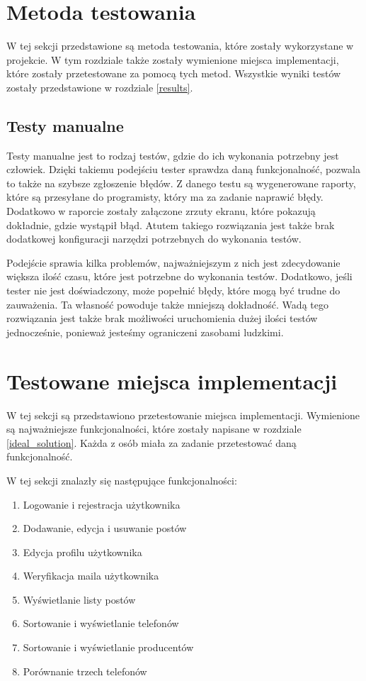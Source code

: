 \section{Metoda testowania}
W tej sekcji przedstawione są metoda testowania, które zostały wykorzystane w projekcie. W tym rozdziale także zostały wymienione miejsca implementacji, które zostały przetestowane za pomocą tych metod. Wszystkie wyniki testów zostały przedstawione w rozdziale \ref{results}. 

\subsection{Testy manualne}
Testy manualne jest to rodzaj testów, gdzie do ich wykonania potrzebny jest człowiek. Dzięki takiemu podejściu tester sprawdza daną funkcjonalność, pozwala to także na szybsze zgłoszenie błędów. Z danego testu są wygenerowane raporty, które są przesyłane do programisty, który ma za zadanie naprawić błędy. Dodatkowo w raporcie zostały załączone zrzuty ekranu, które pokazują dokładnie, gdzie wystąpił błąd. Atutem takiego rozwiązania jest także brak dodatkowej konfiguracji narzędzi potrzebnych do wykonania testów.

Podejście sprawia kilka problemów, najważniejszym z nich jest zdecydowanie większa ilość czasu, które jest potrzebne do wykonania testów. Dodatkowo, jeśli tester nie jest doświadczony, może popełnić błędy, które mogą być trudne do zauważenia. Ta własność powoduje także mniejszą dokładność. Wadą tego rozwiązania jest także brak możliwości uruchomienia dużej ilości testów jednocześnie, ponieważ jesteśmy ograniczeni zasobami ludzkimi. 

\section{Testowane miejsca implementacji}
W tej sekcji są przedstawiono przetestowanie miejsca implementacji. Wymienione są najważniejsze funkcjonalności, które zostały napisane w rozdziale \ref{ideal_solution}. Każda z osób miała za zadanie przetestować daną funkcjonalność.

W tej sekcji znalazły się następujące funkcjonalności:
\begin{enumerate}
  \item Logowanie i rejestracja użytkownika
  \item Dodawanie, edycja i usuwanie postów
  \item Edycja profilu użytkownika
  \item Weryfikacja maila użytkownika
  \item Wyświetlanie listy postów
  \item Sortowanie i wyświetlanie telefonów
  \item Sortowanie i wyświetlanie producentów
  \item Porównanie trzech telefonów
\end{enumerate}

